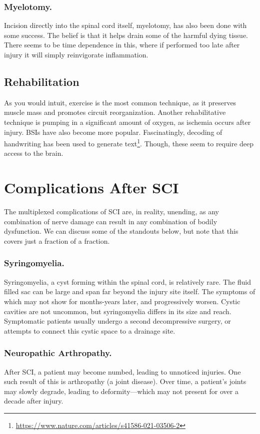 \documentclass[12pt]{report}
\begin{document}
\subsubsection{Myelotomy.}
Incision directly into the spinal cord itself, myelotomy, has also been done with some success. The belief is that it helps drain some of the harmful dying tissue. There seems to be time dependence in this, where if performed too late after injury it will simply reinvigorate inflammation. 

\subsection{Rehabilitation}
As you would intuit, exercise is the most common technique, as it preserves muscle mass and promotes circuit reorganization. Another rehabilitative technique is pumping in a significant amount of oxygen, as ischemia occurs after injury. BSIs have also become more popular. Fascinatingly, decoding of handwriting has been used to generate text\footnote{\url{https://www.nature.com/articles/s41586-021-03506-2}}. Though, these seem to require deep access to the brain. 


\section{Complications After SCI}

The multiplexed complications of SCI are, in reality, unending, as any combination of nerve damage can result in any combination of bodily dysfunction. We can discuss some of the standouts below, but note that this covers just a fraction of a fraction. 

\subsubsection{Syringomyelia.}
Syringomyelia, a cyst forming within the spinal cord, is relatively rare. The fluid filled sac can be large and span far beyond the injury site itself. The symptoms of which may not show for months-years later, and progressively worsen. Cystic cavities are not uncommon, but syringomyelia differs in its size and reach. Symptomatic patients usually undergo a second decompressive surgery, or attempts to connect this cystic space to a drainage site. 

\subsubsection{Neuropathic Arthropathy.}
After SCI, a patient may become numbed, leading to unnoticed injuries. One such result of this is arthropathy (a joint disease). Over time, a patient's joints may slowly degrade, leading to deformity---which may not present for over a decade after injury. 
\end{document}
